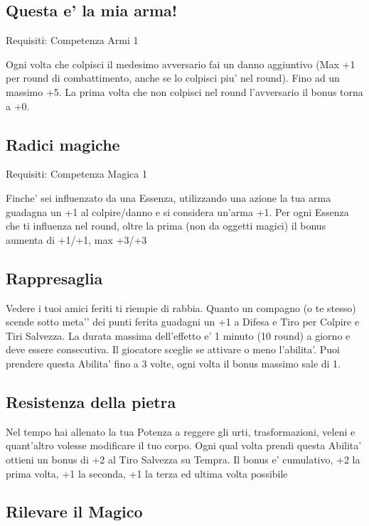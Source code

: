 \documentclass[a4paper,11pt,twoside,openany]{book}
\begin{document}
	\subsection{Questa e' la mia arma!}
	
	Requisiti: Competenza Armi 1
	
	Ogni volta che colpisci il medesimo avversario fai un danno aggiuntivo (Max +1 per round di combattimento, anche se lo colpisci piu' nel round). Fino ad un massimo +5. La prima volta che non colpisci nel round l'avversario il bonus torna a +0.
	
	\subsection{Radici magiche}
	
	Requisiti: Competenza Magica 1
	
	Finche' sei influenzato da una Essenza, utilizzando una azione la tua arma guadagna un +1 al colpire/danno e si considera un'arma +1. Per ogni Essenza che ti influenza nel round, oltre la prima (non da oggetti magici) il bonus aumenta di +1/+1, max +3/+3
	
	\subsection{Rappresaglia}
	
	Vedere i tuoi amici feriti ti riempie di rabbia.
	Quanto un compagno (o te stesso) scende sotto meta'’ dei punti ferita guadagni un +1 a Difesa e Tiro per Colpire e Tiri Salvezza. La durata massima dell’effetto e’ 1 minuto (10 round) a giorno e deve essere consecutiva. Il giocatore sceglie se attivare o meno l’abilita’.
	Puoi prendere questa Abilita' fino a 3 volte, ogni volta il bonus massimo sale di 1.
	
	\subsection{Resistenza della pietra}
	
	Nel tempo hai allenato la tua Potenza a reggere gli urti, trasformazioni, veleni e quant'altro volesse modificare il tuo corpo. Ogni qual volta prendi questa Abilita' ottieni un bonus di +2 al Tiro Salvezza su Tempra. Il bonus e' cumulativo, +2 la prima volta, +1 la seconda, +1 la terza ed ultima volta possibile
	
	\subsection{Rilevare il Magico}
	
\end{document}
